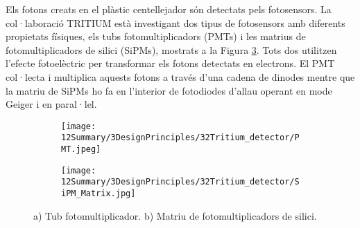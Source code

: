 Els fotons creats en el plàstic centellejador són detectats pels fotosensors. La col·laboració TRITIUM està investigant dos tipus de fotosensors amb diferents propietats físiques, els tubs fotomultiplicadors (PMTs) i les matrius de fotomultiplicadors de silici (SiPMs), mostrats a la Figura \ref{fig:Fotosensors}. Tots dos utilitzen l'efecte fotoelèctric per transformar els fotons detectats en electrons. El PMT col·lecta i multiplica aquests fotons a través d'una cadena de dinodes mentre que la matriu de SiPMs ho fa en l'interior de fotodiodes d'allau operant en mode Geiger i en paral·lel.

\begin{figure}[htpb]
\centering
    \begin{subfigure}[b]{0.4\textwidth}
    \centering
    \texttt{[image: 12Summary/3DesignPrinciples/32Tritium\_detector/PMT.jpeg]}  
    \caption{\label{subfig:PMT}}
    \end{subfigure}
    \hfill
    \begin{subfigure}[b]{0.4\textwidth}
    \centering
    \texttt{[image: 12Summary/3DesignPrinciples/32Tritium\_detector/SiPM\_Matrix.jpg]}  
    \caption{\label{subfig:SiPM}}
    \end{subfigure}
 \caption{a) Tub fotomultiplicador. b) Matriu de fotomultiplicadors de silici.}
 \label{fig:Fotosensors}
\end{figure}

